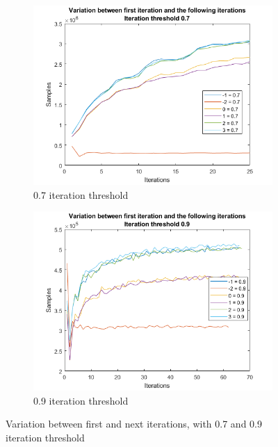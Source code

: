 \begin{figure}
    \centering
    \begin{subfigure}[b]{.45\textwidth}
        \centering
        \includegraphics[width=\textwidth]{figures/varfirst-0.7.png}
        \caption{0.7 iteration threshold}
        \label{sfig:iter:varfirst0.7}
    \end{subfigure}
    \hfill
    \begin{subfigure}[b]{.45\textwidth}
        \centering
        \includegraphics[width=\textwidth]{figures/varfirst-0.9.png}
        \caption{0.9 iteration threshold}
        \label{sfig:iter:varfirst0.9}
    \end{subfigure}
    \caption{Variation between first and next iterations, with 0.7 and 0.9 iteration threshold}
    \label{fig:iter:varfirst0.70.9}
\end{figure}

